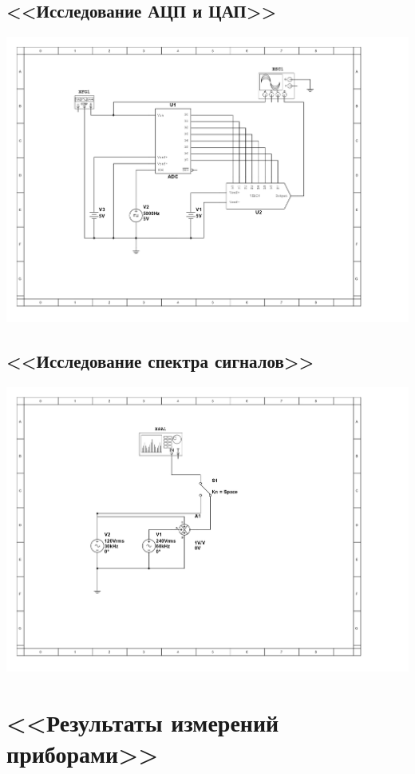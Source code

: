 \documentclass[11pt]{article}
\begin{document}
\subsection{<<Исследование АЦП и ЦАП>>}
\includegraphics[width=1\linewidth]{5/scheme.jpg}
\subsection{<<Исследование спектра сигналов>>}
\includegraphics[width=1\linewidth]{6/scheme.jpg}
\section{<<Результаты измерений приборами>>}
\end{document}
